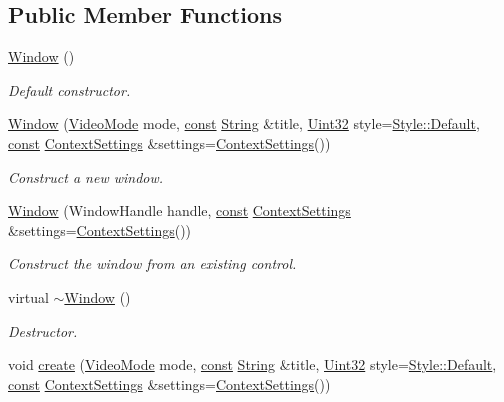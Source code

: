\subsection*{Public Member Functions}
\begin{DoxyCompactItemize}
\item 
\hyperlink{classsf_1_1_window_a5359122166b4dc492c3d25caf08ccfc4}{Window} ()
\begin{DoxyCompactList}\small\item\em Default constructor. \end{DoxyCompactList}\item 
\hyperlink{classsf_1_1_window_a1bee771baecbae6d357871929dc042a2}{Window} (\hyperlink{classsf_1_1_video_mode}{Video\-Mode} mode, \hyperlink{term__entry_8h_a57bd63ce7f9a353488880e3de6692d5a}{const} \hyperlink{classsf_1_1_string}{String} \&title, \hyperlink{namespacesf_aa746fb1ddef4410bddf198ebb27e727c}{Uint32} style=\hyperlink{group__window_gga363853f6419f9ca64dcd85eae2e5caa9aaf73ca9c9fa787f9da9c1d7527d42734}{Style\-::\-Default}, \hyperlink{term__entry_8h_a57bd63ce7f9a353488880e3de6692d5a}{const} \hyperlink{structsf_1_1_context_settings}{Context\-Settings} \&settings=\hyperlink{structsf_1_1_context_settings}{Context\-Settings}())
\begin{DoxyCompactList}\small\item\em Construct a new window. \end{DoxyCompactList}\item 
\hyperlink{classsf_1_1_window_a6d60912633bff9d33cf3ade4e0201de4}{Window} (Window\-Handle handle, \hyperlink{term__entry_8h_a57bd63ce7f9a353488880e3de6692d5a}{const} \hyperlink{structsf_1_1_context_settings}{Context\-Settings} \&settings=\hyperlink{structsf_1_1_context_settings}{Context\-Settings}())
\begin{DoxyCompactList}\small\item\em Construct the window from an existing control. \end{DoxyCompactList}\item 
virtual \hyperlink{classsf_1_1_window_ac30eb6ea5f5594204944d09d4bd69a97}{$\sim$\-Window} ()
\begin{DoxyCompactList}\small\item\em Destructor. \end{DoxyCompactList}\item 
void \hyperlink{classsf_1_1_window_a30e6edf2162f8dbff61023b9de5d961d}{create} (\hyperlink{classsf_1_1_video_mode}{Video\-Mode} mode, \hyperlink{term__entry_8h_a57bd63ce7f9a353488880e3de6692d5a}{const} \hyperlink{classsf_1_1_string}{String} \&title, \hyperlink{namespacesf_aa746fb1ddef4410bddf198ebb27e727c}{Uint32} style=\hyperlink{group__window_gga363853f6419f9ca64dcd85eae2e5caa9aaf73ca9c9fa787f9da9c1d7527d42734}{Style\-::\-Default}, \hyperlink{term__entry_8h_a57bd63ce7f9a353488880e3de6692d5a}{const} \hyperlink{structsf_1_1_context_settings}{Context\-Settings} \&settings=\hyperlink{structsf_1_1_context_settings}{Context\-Settings}())

\end{DoxyCompactItemize}
